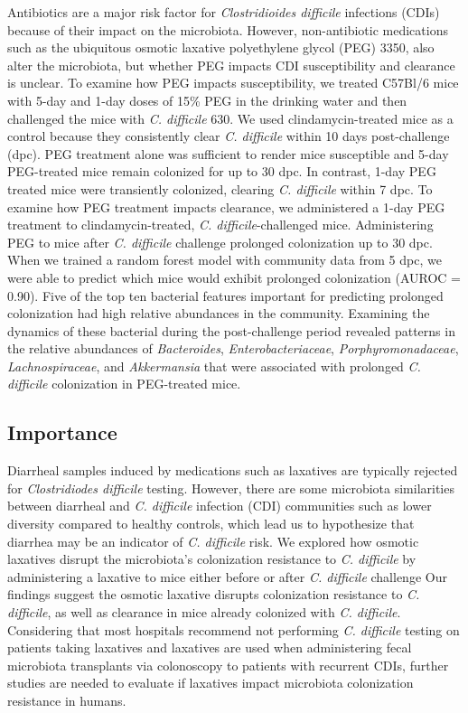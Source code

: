 \documentclass[
  11pt,
]{article}
\begin{document}
Antibiotics are a major risk factor for \emph{Clostridioides difficile}
infections (CDIs) because of their impact on the microbiota. However,
non-antibiotic medications such as the ubiquitous osmotic laxative
polyethylene glycol (PEG) 3350, also alter the microbiota, but whether
PEG impacts CDI susceptibility and clearance is unclear. To examine how
PEG impacts susceptibility, we treated C57Bl/6 mice with 5-day and 1-day
doses of 15\% PEG in the drinking water and then challenged the mice
with \emph{C. difficile} 630. We used clindamycin-treated mice as a
control because they consistently clear \emph{C. difficile} within 10
days post-challenge (dpc). PEG treatment alone was sufficient to render
mice susceptible and 5-day PEG-treated mice remain colonized for up to
30 dpc. In contrast, 1-day PEG treated mice were transiently colonized,
clearing \emph{C. difficile} within 7 dpc. To examine how PEG treatment
impacts clearance, we administered a 1-day PEG treatment to
clindamycin-treated, \emph{C. difficile}-challenged mice. Administering
PEG to mice after \emph{C. difficile} challenge prolonged colonization
up to 30 dpc. When we trained a random forest model with community data
from 5 dpc, we were able to predict which mice would exhibit prolonged
colonization (AUROC = 0.90). Five of the top ten bacterial features
important for predicting prolonged colonization had high relative
abundances in the community. Examining the dynamics of these bacterial
during the post-challenge period revealed patterns in the relative
abundances of \emph{Bacteroides}, \emph{Enterobacteriaceae},
\emph{Porphyromonadaceae}, \emph{Lachnospiraceae}, and
\emph{Akkermansia} that were associated with prolonged \emph{C.
difficile} colonization in PEG-treated mice.

\hypertarget{importance}{%
\subsection{Importance}\label{importance}}

Diarrheal samples induced by medications such as laxatives are typically
rejected for \emph{Clostridiodes difficile} testing. However, there are
some microbiota similarities between diarrheal and \emph{C. difficile}
infection (CDI) communities such as lower diversity compared to healthy
controls, which lead us to hypothesize that diarrhea may be an indicator
of \emph{C. difficile} risk. We explored how osmotic laxatives disrupt
the microbiota's colonization resistance to \emph{C. difficile} by
administering a laxative to mice either before or after \emph{C.
difficile} challenge Our findings suggest the osmotic laxative disrupts
colonization resistance to \emph{C. difficile}, as well as clearance in
mice already colonized with \emph{C. difficile}. Considering that most
hospitals recommend not performing \emph{C. difficile} testing on
patients taking laxatives and laxatives are used when administering
fecal microbiota transplants via colonoscopy to patients with recurrent
CDIs, further studies are needed to evaluate if laxatives impact
microbiota colonization resistance in humans.
\end{document}
